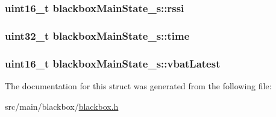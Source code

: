 \hypertarget{structblackboxMainState__s_aa77d50912ffcb5473411467a739d02f0}{
\subsubsection[{rssi}]{\setlength{\rightskip}{0pt plus 5cm}uint16\+\_\+t blackbox\+Main\+State\+\_\+s\+::rssi}}\label{structblackboxMainState__s_aa77d50912ffcb5473411467a739d02f0}
\hypertarget{structblackboxMainState__s_a9571e17beb1935633b58ec60d844db4d}{
\subsubsection[{time}]{\setlength{\rightskip}{0pt plus 5cm}uint32\+\_\+t blackbox\+Main\+State\+\_\+s\+::time}}\label{structblackboxMainState__s_a9571e17beb1935633b58ec60d844db4d}
\hypertarget{structblackboxMainState__s_a755ac9d3422af2a9905207a3ecb25e44}{
\subsubsection[{vbat\+Latest}]{\setlength{\rightskip}{0pt plus 5cm}uint16\+\_\+t blackbox\+Main\+State\+\_\+s\+::vbat\+Latest}}\label{structblackboxMainState__s_a755ac9d3422af2a9905207a3ecb25e44}


The documentation for this struct was generated from the following file\+:\begin{DoxyCompactItemize}
\item 
src/main/blackbox/\hyperlink{blackbox_2blackbox_8h}{blackbox.\+h}\end{DoxyCompactItemize}
